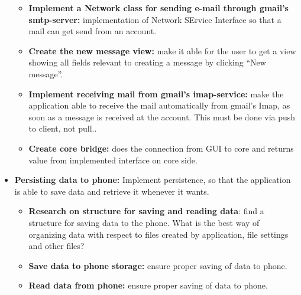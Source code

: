 \begin{itemize}
\begin{itemize}
\item{}\textbf{Implement a Network class for sending e-mail through gmail’s smtp-server:} implementation of Network SErvice Interface so that a mail can get send from an account.
\item{}\textbf{Create the new message view:} make it able for the user to get a view showing all fields relevant to creating a message by clicking “New message”.
\item{}\textbf{Implement receiving mail from gmail’s imap-service:} make the application able to receive the mail automatically from gmail’s Imap, as soon as a message is received at the account. This must be done via push to client, not pull..
\item{}\textbf{Create core bridge:} does the connection from GUI to core and returns value from implemented interface on core side.
\end{itemize}
\item{}\textbf{Persisting data to phone:} Implement persistence, so that the application is able to save data and retrieve it whenever it wants.
\begin{itemize}
\item{}\textbf{Research on structure for saving and reading data}: find a structure for saving data to the phone. What is the best way of organizing data with respect to files created by application, file settings and other files?
\item{}\textbf{Save data to phone storage:} ensure proper saving of data to phone.
\item{}\textbf{Read data from phone:} ensure proper saving of data to phone.
\end{itemize}
\end{itemize}

